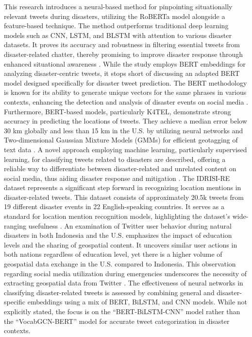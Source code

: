 \documentclass[conference]{IEEEtran}
\begin{document}
This research introduces a neural-based method for pinpointing situationally relevant tweets during disasters, utilizing the RoBERTa model alongside a feature-based technique. The method outperforms traditional deep learning models such as CNN, LSTM, and BLSTM with attention to various disaster datasets. It proves its accuracy and robustness in filtering essential tweets from disaster-related chatter, thereby promising to improve disaster response through enhanced situational awareness \cite{b2}. While the study employs BERT embeddings for analyzing disaster-centric tweets, it stops short of discussing an adapted BERT model designed specifically for disaster tweet prediction. The BERT methodology is known for its ability to generate unique vectors for the same phrases in various contexts, enhancing the detection and analysis of disaster events on social media \cite{b3}. Furthermore, BERT-based models, particularly K4TEL, demonstrate strong accuracy in predicting the locations of tweets. They achieve a median error below 30 km globally and less than 15 km in the U.S. by utilizing neural networks and Two-dimensional Gaussian Mixture Models (GMMs) for efficient geotagging of text data \cite{b8}. A novel approach employing machine learning, particularly supervised learning, for classifying tweets related to disasters are described, offering a reliable way to differentiate between disaster-related and unrelated content on social media, thus aiding disaster response and mitigation \cite{b4}. The IDRISI-RE dataset represents a significant step forward in recognizing location mentions in disaster-related tweets. This dataset consists of approximately 20.5k tweets from 19 different disaster events in 22 English-speaking countries. It serves as a standard for location mention recognition models, highlighting the dataset's wide-ranging usefulness \cite{b6}. An examination of Twitter user behavior during natural disasters in both Indonesia and the U.S. emphasizes the impact of education levels and the sharing of geospatial content. It uncovers similar user actions in both nations regardless of education level, yet there is a higher volume of geospatial data exchange in the U.S. compared to Indonesia. This observation regarding social media utilization during emergencies underscores the necessity of extracting geospatial data from Twitter \cite{b11}. The effectiveness of neural networks in classifying disaster-related tweets is assessed by combining general and disaster-specific embeddings using a mix of BERT, BiLSTM, and CNN models. While not explicitly stated, the focus is on the ``BERT-BiLSTM-CNN'' \cite{b13} \cite{b26} model rather than the ``VocabGCN-BERT'' model for accurate tweet categorization in disaster contexts.
\end{document}
